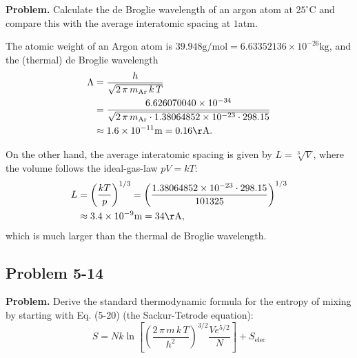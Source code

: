 \documentclass[twocolumn, 10pt]{article}
\numberwithin{equation}{section}
\newenvironment{problem}
{\par\medskip \color{problemblue}
  \textbf{Problem. }\ignorespaces}
{\medskip}
\newenvironment{solution}[1][\empty]
{\par\medskip\sffamily
  \textbf{\ifx\empty#1{Solution.}\relax\else{#1}\fi} \ignorespaces}
{\medskip}
\begin{document}
\begin{problem}
  Calculate the de Broglie wavelength of an argon atom at $25^{\circ}$C
  and compare this with the average interatomic spacing at $1$atm.
\end{problem}

\begin{solution}
The atomic weight of an Argon atom is
$39.948 \mathrm{g/mol} = 6.63352136\times 10^{-26} \mathrm{kg}$,
and the (thermal) de Broglie wavelength
\begin{align*}
\Lambda
  &= \frac{h}{ \sqrt{2\,\pi\,m_\mathrm{Ar}\,k\,T} }
  \\
  &= \frac{ 6.626070040 \times 10^{-34} }
  { \sqrt{2 \, \pi \, m_\mathrm{Ar} \cdot 1.38064852 \times 10^{-23} \cdot 298.15} }
  \\
  &\approx 1.6\times10^{-11}\mathrm{m} = 0.16\mathrm{\AA}.
\end{align*}

On the other hand,
the average interatomic spacing
  is given by $L = \sqrt[3]{V}$,
where the volume follows the ideal-gas-law $pV = kT$:
\begin{align*}
  L
  &= \left(\frac{ kT } { p} \right)^{1/3}
  = \left(
  \frac{ 1.38064852 \times 10^{-23} \cdot 298.15 }
  { 101325 } \right)^{1/3}
  \\
  &\approx 3.4\times10^{-9} \mathrm{m}
  = 34\mathrm{\AA},
\end{align*}
which is much larger than the thermal de Broglie wavelength.
%
\end{solution}

\subsection{Problem 5-14}

\begin{problem}
  Derive the standard thermodynamic formula for the entropy of mixing
  by starting with Eq. (5-20) (the Sackur-Tetrode equation):
  \begin{equation}
    S = N k \ln \left[
      \left( \frac{ 2 \, \pi \, m \, k \, T } { h^2 }
      \right)^{3/2}
      \frac{ V e^{5/2} } { N }
      \right] + S_\mathrm{elec}
    \tag{5-20}
    \label{eq:Sstd}
  \end{equation}
\end{problem}
\end{document}
